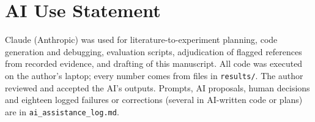 \documentclass[conference]{IEEEtran}
\begin{document}
\section*{AI Use Statement}
Claude (Anthropic) was used for literature-to-experiment planning, code generation and debugging,
evaluation scripts, adjudication of flagged references from recorded evidence, and drafting of this
manuscript. All code was executed on the author's laptop; every number comes from files in
\texttt{results/}. The author reviewed and accepted the AI's outputs. Prompts, AI proposals, human
decisions and eighteen logged failures or corrections (several in AI-written code or plans) are in
\texttt{ai\_assistance\_log.md}.



\end{document}
